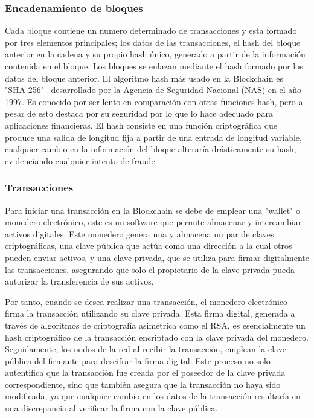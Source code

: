 

\subsubsection{Encadenamiento de bloques}

Cada bloque contiene un numero determinado de transacciones y esta formado por tres elementos principales; los datos de las transacciones, el hash del bloque anterior en la cadena  y su propio hash único, generado a partir de la información contenida en el bloque.
Los bloques se enlazan mediante el hash formado por los datos del bloque anterior.
El algoritmo hash más usado en la Blockchain es "SHA-256"~\cite{sha256} desarrollado por la Agencia de Seguridad Nacional (NAS) en el año 1997. Es conocido por ser lento en comparación con otras funciones hash, pero a pesar de esto destaca por su seguridad por lo que lo hace adecuado para aplicaciones financieras.
El hash consiste en una función criptográfica que produce una salida de longitud fija a partir de una entrada de longitud variable, cualquier cambio en la información del bloque alteraría drásticamente su hash, evidenciando cualquier intento de fraude.



\subsubsection{Transacciones}

Para iniciar una transacción en la Blockchain se debe de emplear una "wallet" o monedero electrónico, este es un software que permite almacenar y intercambiar activos digitales.
Este monedero genera una y almacena un par de claves criptográficas, una clave pública que actúa como una dirección a la cual otros pueden enviar activos, y una clave privada, que se utiliza para firmar digitalmente las transacciones, asegurando que solo el propietario de la clave privada pueda autorizar la transferencia de sus activos.

Por tanto, cuando se desea realizar una transacción, el monedero electrónico firma la transacción utilizando su clave privada. Esta firma digital, generada a través de algoritmos de criptografía asimétrica como el RSA, es esencialmente un hash criptográfico de la transacción encriptado con la clave privada del monedero.
Seguidamente, los nodos de la red al recibir la transacción, emplean la clave pública del firmante para descifrar la firma digital. Este proceso no solo autentifica que la transacción fue creada por el poseedor de la clave privada correspondiente, sino que también asegura que la transacción no haya sido modificada, ya que cualquier cambio en los datos de la transacción resultaría en una discrepancia al verificar la firma con la clave pública.

